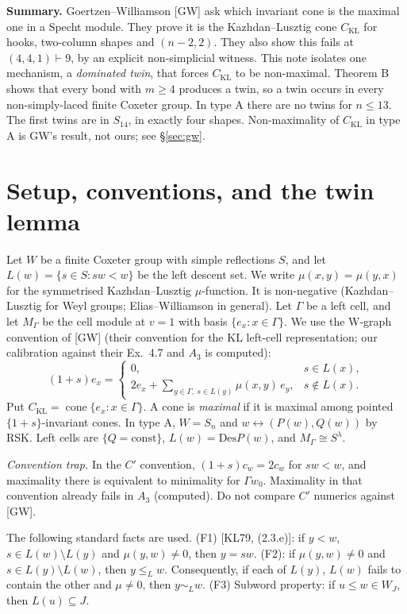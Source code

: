 \documentclass[11pt]{amsart}
\newcommand{\gr}[1]{\textsf{#1}}
\theoremstyle{definition}
\theoremstyle{remark}
\newcommand{\CKL}{C_{\mathrm{KL}}}
\newcommand{\Des}{\mathrm{Des}}
\begin{document}
\medskip
\noindent\textbf{Summary.} Goertzen--Williamson [GW] ask which invariant cone is the maximal one in a Specht module. They prove it is the Kazhdan--Lusztig cone $\CKL$ for hooks, two-column shapes and $(n-2,2)$. They also show this fails at $(4,4,1)\vdash 9$, by an explicit non-simplicial witness. This note isolates one mechanism, a \emph{dominated twin}, that forces $\CKL$ to be non-maximal. Theorem B shows that every bond with $m\ge4$ produces a twin, so a twin occurs in every non-simply-laced finite Coxeter group. In type A there are no twins for $n\le 13$. The first twins are in $S_{14}$, in exactly four shapes. Non-maximality of $\CKL$ in type A is GW's result, not ours; see \S\ref{sec:gw}.

\section{Setup, conventions, and the twin lemma}

Let $W$ be a finite Coxeter group with simple reflections $S$, and let $L(w)=\{s\in S: sw<w\}$ be the left descent set. We write $\mu(x,y)=\mu(y,x)$ for the symmetrised Kazhdan--Lusztig $\mu$-function. It is non-negative (Kazhdan--Lusztig for Weyl groups; Elias--Williamson in general). Let $\Gamma$ be a left cell, and let $M_\Gamma$ be the cell module at $v=1$ with basis $\{e_x:x\in\Gamma\}$. We use the W-graph convention of [GW] (their convention for the KL left-cell representation; our calibration against their Ex.~4.7 and $A_3$ is \gr{computed}):
\[
(1+s)e_x=\begin{cases}0,& s\in L(x),\\[2pt] 2e_x+\sum_{y\in\Gamma,\ s\in L(y)}\mu(x,y)\,e_y,& s\notin L(x).\end{cases}
\]
Put $\CKL=\operatorname{cone}\{e_x:x\in\Gamma\}$. A cone is \emph{maximal} if it is maximal among pointed $\{1+s\}$-invariant cones. In type A, $W=S_n$ and $w\leftrightarrow(P(w),Q(w))$ by RSK. Left cells are $\{Q=\text{const}\}$, $L(w)=\Des P(w)$, and $M_\Gamma\cong S^{\lambda}$.

\emph{Convention trap.} In the $C'$ convention, $(1+s)c_w=2c_w$ for $sw<w$, and maximality there is equivalent to minimality for $\Gamma w_0$. Maximality in that convention already fails in $A_3$ (\gr{computed}). Do not compare $C'$ numerics against [GW].

The following standard facts are used. (F1) [KL79, (2.3.e)]: if $y<w$, $s\in L(w)\setminus L(y)$ and $\mu(y,w)\ne0$, then $y=sw$. (F2): if $\mu(y,w)\ne0$ and $s\in L(y)\setminus L(w)$, then $y\le_L w$. Consequently, if each of $L(y)$, $L(w)$ fails to contain the other and $\mu\ne0$, then $y\sim_L w$. (F3) Subword property: if $u\le w\in W_J$, then $L(u)\subseteq J$.
\end{document}
